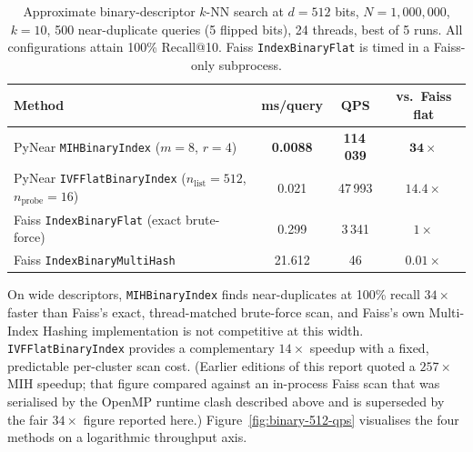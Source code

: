 \documentclass[11pt,a4paper]{article}
\begin{document}
\begin{table}[h]
\centering
\caption{Approximate binary-descriptor $k$-NN search at $d = 512$ bits,
  $N=1{,}000{,}000$, $k=10$, 500 near-duplicate queries (5 flipped bits),
  24 threads, best of 5 runs.  All configurations attain 100\% Recall@10.
  Faiss \texttt{IndexBinaryFlat} is timed in a Faiss-only subprocess.}
\label{tab:binary-512}
\renewcommand{\arraystretch}{1.25}
\small
\begin{tabular}{lccc}
\toprule
\textbf{Method} & \textbf{ms/query} & \textbf{QPS} & \textbf{vs.\ Faiss flat} \\
\midrule
PyNear \texttt{MIHBinaryIndex} ($m=8$, $r=4$) & \textbf{0.0088} & \textbf{114\,039} & $\mathbf{34\times}$ \\
PyNear \texttt{IVFFlatBinaryIndex} ($n_{\mathrm{list}}{=}512$, $n_{\mathrm{probe}}{=}16$) & 0.021 & 47\,993 & $14.4\times$ \\
Faiss \texttt{IndexBinaryFlat} (exact brute-force) & 0.299 & 3\,341 & $1\times$ \\
Faiss \texttt{IndexBinaryMultiHash} & 21.612 & 46 & $0.01\times$ \\
\bottomrule
\end{tabular}
\end{table}

On wide descriptors, \texttt{MIHBinaryIndex} finds near-duplicates at
100\% recall $34\times$ faster than Faiss's exact, thread-matched
brute-force scan, and Faiss's own Multi-Index Hashing implementation is not
competitive at this width.  \texttt{IVFFlatBinaryIndex} provides a
complementary $14\times$ speedup with a fixed, predictable per-cluster scan
cost.  (Earlier editions of this report quoted a $257\times$ MIH speedup;
that figure compared against an in-process Faiss scan that was serialised
by the OpenMP runtime clash described above and is superseded by the fair
$34\times$ figure reported here.)  Figure~\ref{fig:binary-512-qps}
visualises the four methods on a logarithmic throughput axis.
\end{document}
